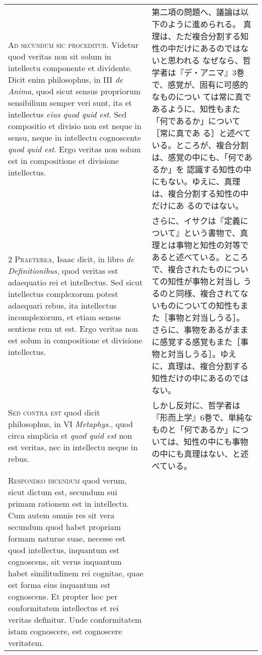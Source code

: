 \documentclass[10pt]{jsarticle} %
\begin{document}
\begin{longtable}{p{21em}p{21em}}


{\huge A}{\scshape d secundum sic proceditur}. Videtur quod veritas non
sit solum in intellectu componente et dividente. Dicit enim philosophus,
in III {\itshape de Anima}, quod sicut sensus propriorum sensibilium
semper veri sunt, ita et intellectus {\itshape eius quod quid est}. Sed
compositio et divisio non est neque in sensu, neque in intellectu
cognoscente {\itshape quod quid est}. Ergo veritas non solum est in
compositione et divisione intellectus.

&

第二項の問題へ、議論は以下のように進められる。
真理は、ただ複合分割する知性の中だけにあるのではないと思われる
なぜなら、哲学者は『デ・アニマ』3巻で、感覚が、固有に可感的なものについ
 ては常に真であるように、知性もまた「何であるか」について［常に真であ
 る］と述べている。ところが、複合分割は、感覚の中にも、「何であるか」を
 認識する知性の中にもない。ゆえに、真理は、複合分割する知性の中だけにあ
 るのではない。
\\


{\scshape 2 Praeterea}, Isaac dicit, in libro {\itshape de
Definitionibus}, quod veritas est adaequatio rei et intellectus. Sed
sicut intellectus complexorum potest adaequari rebus, ita intellectus
incomplexorum, et etiam sensus sentiens rem ut est. Ergo veritas non est
solum in compositione et divisione intellectus.

&

さらに、イサクは『定義について』という書物で、真理とは事物と知性の対等で
 あると述べている。ところで、複合されたものについての知性が事物と対当し
 うるのと同様、複合されてないものについての知性もまた［事物と対当しうる］。
 さらに、事物をあるがままに感覚する感覚もまた［事物と対当しうる］。ゆえ
 に、真理は、複合分割する知性だけの中にあるのではない。

\\


{\scshape Sed contra est} quod dicit philosophus, in VI {\itshape
Metaphys}., quod circa simplicia et {\itshape quod quid est} non est
veritas, nec in intellectu neque in rebus.

&

しかし反対に、哲学者は『形而上学』6巻で、単純なものと「何であるか」につ
 いては、知性の中にも事物の中にも真理はない、と述べている。

\\


{\scshape Respondeo dicendum} quod verum, sicut dictum
est, secundum sui primam rationem est in intellectu. Cum autem omnis res
sit vera secundum quod habet propriam formam naturae suae, necesse est
quod intellectus, inquantum est cognoscens, sit verus inquantum habet
similitudinem rei cognitae, quae est forma eius inquantum est
cognoscens. Et propter hoc per conformitatem intellectus et rei veritas
definitur. Unde conformitatem istam cognoscere, est cognoscere
veritatem. 



\end{longtable}
\end{document}
